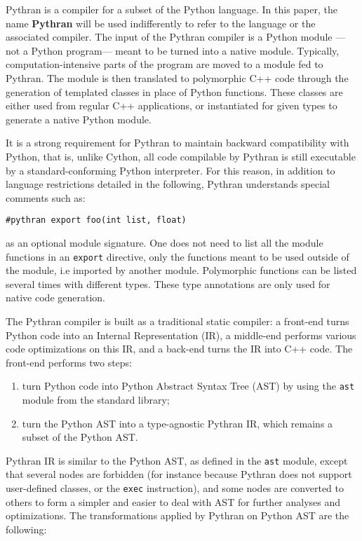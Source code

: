 \documentclass[10pt, onecolumn, preprint]{sigplanconf}
\begin{document}
Pythran is a compiler for a subset of the Python language. In this paper, the
name \textbf{Pythran} will be used indifferently to refer to the language or
the associated compiler. The input of the Pythran compiler is a Python module
---not a Python program--- meant to be turned into a native module. Typically,
computation-intensive parts of the program are moved to a module fed to
Pythran. The module is then translated to polymorphic C++ code through the
generation of templated classes in place of Python functions. These classes are
either used from regular C++ applications, or instantiated for given types to
generate a native Python module.

It is a strong requirement for Pythran to maintain backward compatibility with
Python, that is, unlike Cython, all code compilable by Pythran is still
executable by a standard-conforming Python interpreter. For this reason, in
addition to language restrictions detailed in the following, Pythran
understands special comments such as:

\begin{lstlisting}
#pythran export foo(int list, float)
\end{lstlisting}

as an optional module signature. One does not need to list all the module
functions in an \texttt{export} directive, only the functions meant to be used
outside of the module, i.e imported by another module.
Polymorphic functions can be listed several times with
different types. These type annotations are only used for native code generation.

The Pythran compiler is built as a traditional static compiler: a front-end
turns Python code into an Internal Representation (IR), a middle-end performs
various code optimizations on this IR, and a back-end turns the IR into C++
code. The front-end performs two steps:

\begin{enumerate}

    \item turn Python code into Python Abstract Syntax Tree (AST) by using the \texttt{ast}
   module from the standard library;

    \item turn the Python AST into a type-agnostic Pythran IR, which remains a subset
   of the Python AST.

\end{enumerate}

Pythran IR is similar to the Python AST, as defined in the \texttt{ast} module, except
that several nodes are forbidden (for instance because Pythran does not support
user-defined classes, or the \texttt{exec} instruction), and some nodes are converted
to others to form a simpler and easier to deal with AST for further analyses and
optimizations. The transformations applied by Pythran on Python AST are the
following:
\end{document}
